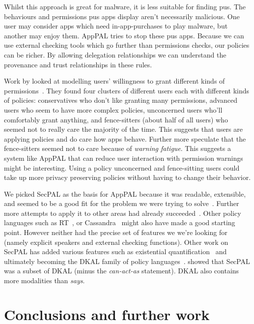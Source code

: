 \documentclass[a4paper]{scrartcl}
\newcommand{\comment}[1]{}%
\begin{document}
Whilst this approach is great for malware, it is less suitable for finding \ac{pus}.
The behaviours and permissions \ac{pus} apps display aren't necessarily malicious.
One user may consider apps which need in-app-purchases to play malware, but another may enjoy them.
AppPAL tries to stop these \ac{pus} apps.
Because we can use external checking tools which go further than permissions checks, our policies can be richer.
By allowing delegation relationships we can understand the provenance and trust relationships in these rules.

Work by \citeauthor{Sadeh:2014vq} looked at modelling users' willingness to grant different kinds of permissions~\citep{Sadeh:2014vq}.
They found four clusters of different users each with different kinds of policies:
  conservatives who don't like granting many permissions,
  advanced users who seem to have more complex policies,
  unconcerned users who'll comfortably grant anything,
  and fence-sitters (about half of all users) who seemed not to really care the majority of the time.
This suggests that users are applying policies and do care how apps behave.
Further more \citeauthor{Sadeh:2014vq} speculate that the fence-sitters seemed not to care because of \emph{warning fatigue}.
This suggests a system like AppPAL that can reduce user interaction with permission warnings might be interesting.
Using a policy unconcerned and fence-sitting users could take up more privacy preserving policies without having to change their behavior.

We picked SecPAL as the basis for AppPAL because it was readable, extensible, and seemed to be a good fit for the problem we were trying to solve~\citep{Hallett:2014un}.
Further more attempts to apply it to other areas had already succeeded~\citep{Aziz:2011vt,Humphrey:2007wc}.
Other policy languages such as RT~\citep{Li:2003ua}, or Cassandra~\citep{Becker:2004il} might also have made a good starting point.
However neither had the precise set of features we we're looking for (namely explicit speakers and external checking functions).
Other work on SecPAL has added various features such as existential quantification~\citep{Becker:2009vt} and ultimately becoming the DKAL family of policy languages~\citep{Gurevich:2008fz,Gurevich:Qo5E3M3}.
\citeauthor{Gurevich:2008fz} showed that SecPAL was a subset of DKAL (minus the \emph{can-act-as} statement).
DKAL also contains more modalities than \emph{says}.


\section{Conclusions and further work \comment{$\frac{1}{2}$ page}}
\end{document}
